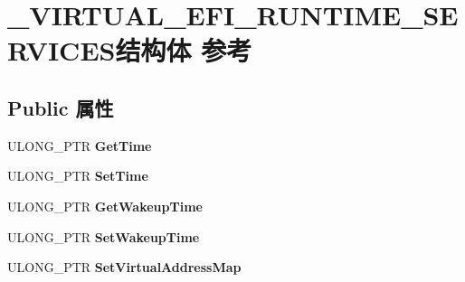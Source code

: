 \hypertarget{struct___v_i_r_t_u_a_l___e_f_i___r_u_n_t_i_m_e___s_e_r_v_i_c_e_s}{}\section{\+\_\+\+V\+I\+R\+T\+U\+A\+L\+\_\+\+E\+F\+I\+\_\+\+R\+U\+N\+T\+I\+M\+E\+\_\+\+S\+E\+R\+V\+I\+C\+E\+S结构体 参考}
\label{struct___v_i_r_t_u_a_l___e_f_i___r_u_n_t_i_m_e___s_e_r_v_i_c_e_s}
\subsection*{Public 属性}
\begin{DoxyCompactItemize}
\item 
\mbox{\label{struct___v_i_r_t_u_a_l___e_f_i___r_u_n_t_i_m_e___s_e_r_v_i_c_e_s_ad3e16ef2e521afdf4d231f247a638470}} 
U\+L\+O\+N\+G\+\_\+\+P\+TR {\bfseries Get\+Time}
\item 
\mbox{\label{struct___v_i_r_t_u_a_l___e_f_i___r_u_n_t_i_m_e___s_e_r_v_i_c_e_s_a9b4a8b75492aeab06c68c5c17d9f5f17}} 
U\+L\+O\+N\+G\+\_\+\+P\+TR {\bfseries Set\+Time}
\item 
\mbox{\label{struct___v_i_r_t_u_a_l___e_f_i___r_u_n_t_i_m_e___s_e_r_v_i_c_e_s_aede143dd019b223ba1f714547a1c7f1b}} 
U\+L\+O\+N\+G\+\_\+\+P\+TR {\bfseries Get\+Wakeup\+Time}
\item 
\mbox{\label{struct___v_i_r_t_u_a_l___e_f_i___r_u_n_t_i_m_e___s_e_r_v_i_c_e_s_ad622261b263dafaeab2fd62935e16fcc}} 
U\+L\+O\+N\+G\+\_\+\+P\+TR {\bfseries Set\+Wakeup\+Time}
\item 
\mbox{\label{struct___v_i_r_t_u_a_l___e_f_i___r_u_n_t_i_m_e___s_e_r_v_i_c_e_s_a9836dfc64db3b259042fff0531593a1a}} 
U\+L\+O\+N\+G\+\_\+\+P\+TR {\bfseries Set\+Virtual\+Address\+Map}
\item 
\mbox{\label{struct___v_i_r_t_u_a_l___e_f_i___r_u_n_t_i_m_e___s_e_r_v_i_c_e_s_a990f6cb10203863f43d3cdc69f285af0}} 

\end{DoxyCompactItemize}
